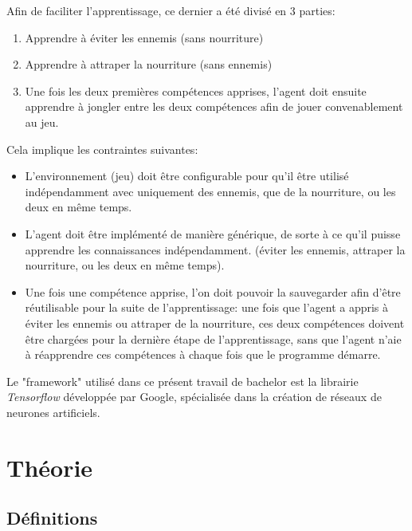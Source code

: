 \documentclass[11pt,a4paper]{report}
\begin{document}
  \par Afin de faciliter l'apprentissage, ce dernier a été divisé en 3 parties: 
  
  \begin{enumerate} 
  \item Apprendre à éviter les ennemis (sans nourriture)
  \item Apprendre à attraper la nourriture (sans ennemis)
  \item Une fois les deux premières compétences apprises, l'agent doit ensuite apprendre à jongler entre les deux compétences afin de jouer convenablement au jeu. 
  \end{enumerate}
  
  \par Cela implique les contraintes suivantes: 
  
  \begin{itemize}
  \item L'environnement (jeu) doit être configurable pour qu'il être utilisé indépendamment avec uniquement des ennemis, que de la nourriture, ou les deux en même temps. 
  \item L'agent doit être implémenté de manière générique, de sorte à ce qu'il puisse apprendre les connaissances indépendamment. (éviter les ennemis, attraper la nourriture, ou les deux en même temps). 
  \item Une fois une compétence apprise, l'on doit pouvoir la sauvegarder afin d'être réutilisable pour la suite de l'apprentissage: une fois que l'agent a appris à éviter les ennemis ou attraper de la nourriture, ces deux compétences doivent être chargées pour la dernière étape de l'apprentissage, sans que l'agent n'aie à réapprendre ces compétences à chaque fois que le programme démarre. 
  \end{itemize}
  
  \par Le "framework" utilisé dans ce présent travail de bachelor est la librairie \textit{Tensorflow} développée par Google, spécialisée dans la création de réseaux de neurones artificiels. 
  
  \chapter{Théorie}
  
  \section{Définitions}
  
\end{document}
